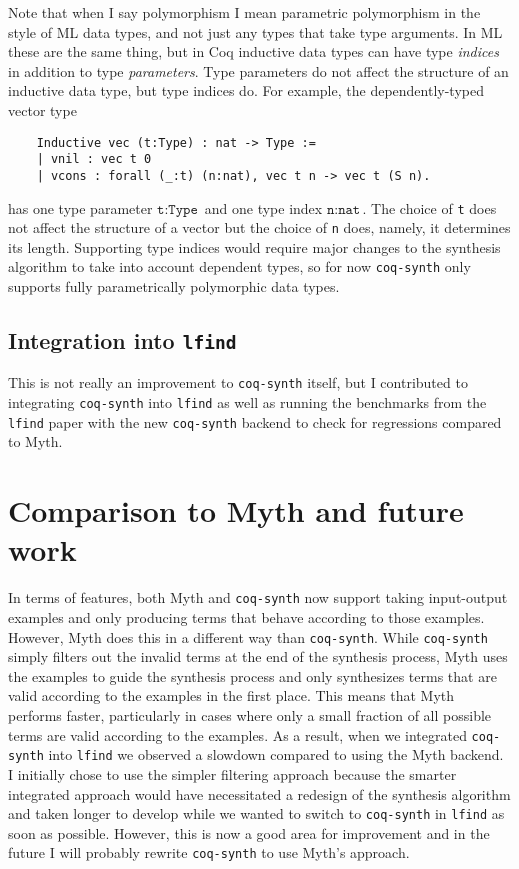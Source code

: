 \documentclass[11pt]{article}
\newcommand{\coq}[1]{\texttt{#1}}
\begin{document}
Note that when I say polymorphism I mean parametric polymorphism in the style of ML data types, and not just any types that take type arguments. In ML these are the same thing, but in Coq inductive data types can have type \emph{indices} in addition to type \emph{parameters}. Type parameters do not affect the structure of an inductive data type, but type indices do. For example, the dependently-typed vector type
\begin{verbatim}
    Inductive vec (t:Type) : nat -> Type :=
    | vnil : vec t 0
    | vcons : forall (_:t) (n:nat), vec t n -> vec t (S n).
\end{verbatim}
has one type parameter $\coq{t} : \coq{Type}$ and one type index $\coq{n} : \coq{nat}$. The choice of \coq{t} does not affect the structure of a vector but the choice of \coq{n} does, namely, it determines its length. Supporting type indices would require major changes to the synthesis algorithm to take into account dependent types, so for now \texttt{coq-synth} only supports fully parametrically polymorphic data types.

\subsection{Integration into \texttt{lfind}}

This is not really an improvement to \texttt{coq-synth} itself, but I contributed to integrating \texttt{coq-synth} into \texttt{lfind} as well as running the benchmarks from the \texttt{lfind} paper with the new \texttt{coq-synth} backend to check for regressions compared to Myth.

\section{Comparison to Myth and future work}

In terms of features, both Myth and \texttt{coq-synth} now support taking input-output examples and only producing terms that behave according to those examples. However, Myth does this in a different way than \texttt{coq-synth}. While \texttt{coq-synth} simply filters out the invalid terms at the end of the synthesis process, Myth uses the examples to guide the synthesis process and only synthesizes terms that are valid according to the examples in the first place. This means that Myth performs faster, particularly in cases where only a small fraction of all possible terms are valid according to the examples. As a result, when we integrated \texttt{coq-synth} into \texttt{lfind} we observed a slowdown compared to using the Myth backend. I initially chose to use the simpler filtering approach because the smarter integrated approach would have necessitated a redesign of the synthesis algorithm and taken longer to develop while we wanted to switch to \texttt{coq-synth} in \texttt{lfind} as soon as possible. However, this is now a good area for improvement and in the future I will probably rewrite \texttt{coq-synth} to use Myth's approach.
\end{document}
